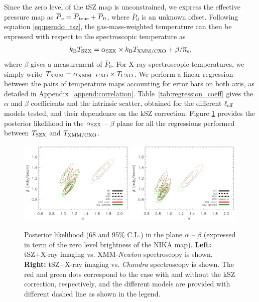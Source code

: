 \documentclass[twocolumn,traditabstract]{aa}
\def\TSZ {T_{\rm SZX}}
\def \TXC {T_{\rm CXO}}
\def \TXX {T_{\rm XMM}}
\def \TXXC {T_{\rm XMM/CXO}}
\begin{document}
Since the zero level of the tSZ map is unconstrained, we express the effective pressure map as $\overline{P}_{\rm e} = \overline{P}_{\rm true} + \overline{P}_0$, where $\overline{P}_0$ is an unknown offset. Following equation \ref{eq:pseudo_tsz}, the gas-mass-weighted temperature can then be expressed with respect to the spectroscopic temperature as
\begin{equation}
k_{\rm B} \TSZ = \alpha_{\rm SZX} \times k_{\rm B} \TXXC+ {\beta}/{\overline{n}_{\rm e}},
\label{eq:TSZ_TX_regression}
\end{equation}
where $\beta$ gives a measurement of $\overline{P}_0$. For X-ray spectroscopic temperatures, we simply write $\TXX = \alpha_{\rm XMM-CXO} \times \TXC$. We perform a linear regression between the pairs of temperature maps accounting for error bars on both axis, as detailed in Appendix~\ref{append:correlation}. Table~\ref{tab:regression_coeff} gives the $\alpha $ and $\beta$ coefficients and the intrinsic scatter, obtained for the different $\ell_{\rm eff}$ models tested, and their dependence on the kSZ correction. Figure \ref{fig:T_SZ_T_X_posterior} provides the posterior likelihood in the $\alpha_{\rm SZX}$ -- $\beta$ plane for all the regressions performed between $\TSZ$ and ${T}_{\rm XMM/CXO}$.

\begin{figure}[h]
\centering
\includegraphics[width=0.49\textwidth]{Figure/Fit_Results_Likelihood_gmw-XMM.pdf}
\includegraphics[width=0.49\textwidth]{Figure/Fit_Results_Likelihood_gmw-CXO.pdf}
\caption{\footnotesize Posterior likelihood (68 and 95\% C.L.) in the plane $\alpha$ -- $\beta$ (expressed in term of the zero level brightness of the NIKA map). {\bf Left:} tSZ+X-ray imaging vs. XMM-\textit{Newton} spectroscopy is shown. {\bf Right:} tSZ+X-ray imaging vs. \textit{Chandra} spectroscopy is shown. The red and green dots correspond to the case with and without the kSZ correction, respectively, and the different models are provided with different dashed line as shown in the legend.}
\label{fig:T_SZ_T_X_posterior}
\end{figure}
\end{document}
